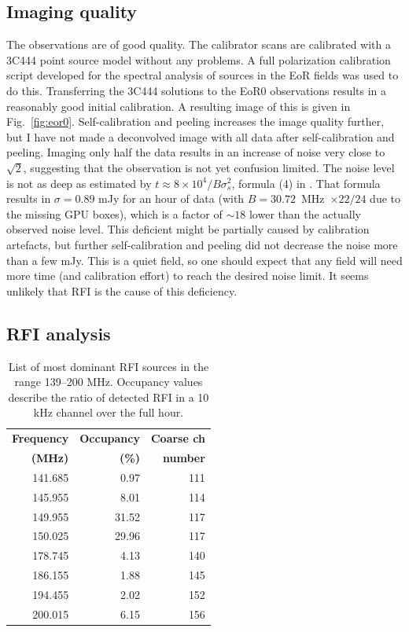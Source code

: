 \documentclass[a4paper,10pt]{article}
\begin{document}
\subsection{Imaging quality}
The observations are of good quality. The calibrator scans are calibrated with a 3C444 point source model without any problems. A full polarization calibration script developed for the spectral analysis of sources in the EoR fields was used to do this. Transferring the 3C444 solutions to the EoR0 observations results in a reasonably good initial calibration. A resulting image of this is given in Fig.~\ref{fig:eor0}. Self-calibration and peeling increases the image quality further, but I have not made a deconvolved image with all data after self-calibration and peeling. Imaging only half the data results in an increase of noise very close to $\sqrt{2}$, suggesting that the observation is not yet confusion limited. The noise level is not as deep as estimated by $t \approx 8 \times 10^4/B\sigma^2_s$, formula (4) in \citet{mwa}. That formula results in $\sigma = 0.89$ mJy for an hour of data (with $B=30.72$~MHz~$\times 22/24$ due to the missing GPU boxes), which is a factor of $\sim 18$ lower than the actually observed noise level. This deficient might be partially caused by calibration artefacts, but further self-calibration and peeling did not decrease the noise more than a few mJy. This is a quiet field, so one should expect that any field will need more time (and calibration effort) to reach the desired noise limit. It seems unlikely that RFI is the cause of this deficiency.

\subsection{RFI analysis}
\begin{table}
\caption{List of most dominant RFI sources in the range 139--200 MHz. Occupancy values describe the ratio of detected RFI in a 10 kHz channel over the full hour.}\label{table:rfi-sources}\begin{center}\begin{tabular}{rrr}
\hline
\hline
\textbf{Frequency}& \textbf{Occupancy} & \textbf{Coarse ch} \\
\textbf{(MHz)}& \textbf{(\%)} & \textbf{number} \\
\hline
141.685 &  0.97 & 111 \\
145.955 &  8.01 & 114 \\
149.955 & 31.52 & 117 \\
150.025 & 29.96 & 117 \\
178.745 &  4.13 & 140 \\
186.155 &  1.88 & 145 \\
194.455 &  2.02 & 152 \\
200.015 &  6.15 & 156 \\
\hline
\end{tabular}
\end{center}
\end{table}
\end{document}
